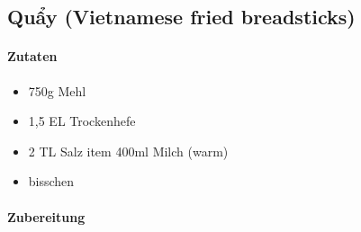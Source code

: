 \subsection{Quẩy (Vietnamese fried breadsticks)}
\paragraph{Zutaten}
\begin{itemize}[noitemsep]
	\item 750g Mehl
	\item 1,5 EL Trockenhefe
	\item 2 TL Salz
	item 400ml Milch (warm)
	\item bisschen
\end{itemize}
\paragraph{Zubereitung}
